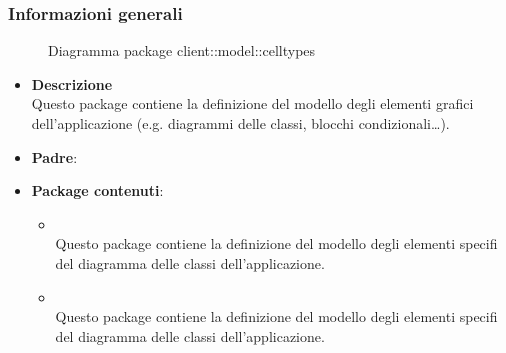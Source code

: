 \subsubsection{Informazioni generali}
\begin{figure}[H]
	\caption{Diagramma package client::model::celltypes}
\end{figure}
\begin{itemize}
\item \textbf{Descrizione}\\
Questo package contiene la definizione del modello degli elementi grafici dell'applicazione (e.g. diagrammi delle classi, blocchi condizionali\dots). 
\item \textbf{Padre}: \hyperref[\nogloxy{swedesigner::client::model}]{}
\item \textbf{Package contenuti}:
\begin{itemize}
\item \hyperref[\nogloxy{swedesigner::client::model::celltypes::activity}]{}\\
Questo package contiene la definizione del modello degli elementi specifi del diagramma delle classi dell'applicazione.
\item \hyperref[\nogloxy{swedesigner::client::model::celltypes::class}]{}\\
Questo package contiene la definizione del modello degli elementi specifi del diagramma delle classi dell'applicazione.
\end{itemize}
\end{itemize}
